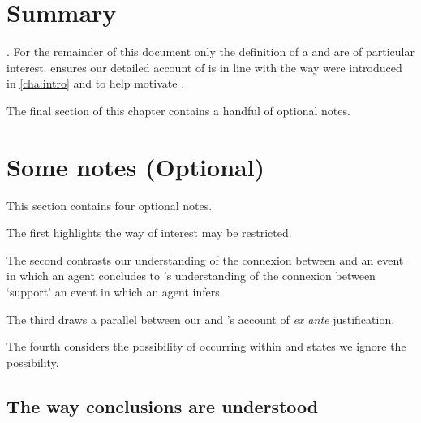 \section*{Summary}


\begin{note}
  \ros{}.
  For the remainder of this document only the definition of a \wit{} and \supportII{} are of particular interest.
  \supportI{} ensures our detailed account of \ros{} is in line with the way \ros{} were introduced in \autoref{cha:intro} and to help motivate \supportII{}.
\end{note}


\begin{note}
  The final section of this chapter contains a handful of optional notes.
\end{note}


\section[Some notes]{Some notes \hfill (Optional)}


\begin{note}
  This section contains four optional notes.

  The first highlights the way  of interest may be restricted.

  The second contrasts our understanding of the connexion between  and an event in which an agent concludes to \citeauthor{Boghossian:2014aa}'s understanding of the connexion between `support' an event in which an agent infers.

  The third draws a parallel between our \supportII{} and \citeauthor{Goldman:1979ui}'s account of \emph{ex ante} justification.

  The fourth considers the possibility of \ros{} occurring within \ros{} and states we ignore the possibility.
\end{note}


\subsection*{The way conclusions are understood}


